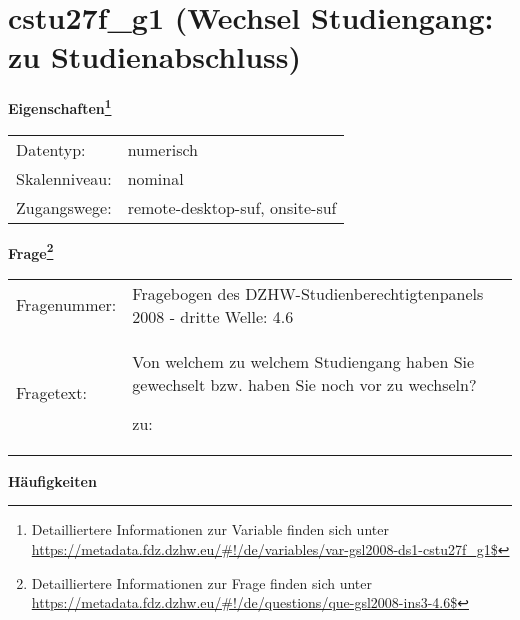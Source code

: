 
    \setcounter{footnote}{0}

    \vspace*{-1.8cm}
	\section{cstu27f\_g1 (Wechsel Studiengang: zu Studienabschluss)}
	\label{section:cstu27f_g1}



    \vspace*{0.5cm}
    \noindent\textbf{Eigenschaften\footnote{Detailliertere Informationen zur Variable finden sich unter
		\url{https://metadata.fdz.dzhw.eu/\#!/de/variables/var-gsl2008-ds1-cstu27f_g1$}}}\\
	\begin{tabularx}{\hsize}{@{}lX}
	Datentyp: & numerisch \\
	Skalenniveau: & nominal \\
	Zugangswege: &
	  remote-desktop-suf, 
	  onsite-suf
 \\
    \end{tabularx}



				\vspace*{0.5cm}
                \noindent\textbf{Frage\footnote{Detailliertere Informationen zur Frage finden sich unter
		              \url{https://metadata.fdz.dzhw.eu/\#!/de/questions/que-gsl2008-ins3-4.6$}}}\\
				\begin{tabularx}{\hsize}{@{}lX}
					Fragenummer: &
					  Fragebogen des DZHW-Studienberechtigtenpanels 2008 - dritte Welle:
					  4.6
 \\
					Fragetext: & Von welchem zu welchem Studiengang haben Sie gewechselt bzw. haben Sie noch vor zu wechseln?\par  zu: \\
				\end{tabularx}





        		\vspace*{0.5cm}
                \noindent\textbf{Häufigkeiten}

